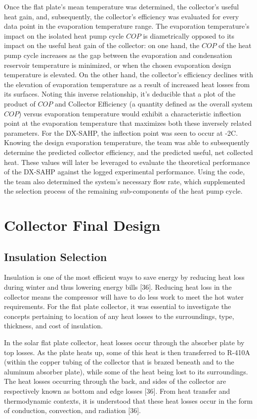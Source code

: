 \medskip
Once the flat plate’s mean temperature was determined, the collector’s useful heat gain, and, subsequently, the collector’s efficiency was evaluated for every data point in the evaporation temperature range. The evaporation temperature’s impact on the isolated heat pump cycle $COP$ is diametrically opposed to its impact on the useful heat gain of the collector: on one hand, the $COP$ of the heat pump cycle increases as the gap between the evaporation and condensation reservoir temperature is minimized, or when the chosen evaporation design temperature is elevated. On the other hand, the collector’s efficiency declines with the elevation of evaporation temperature as a result of increased heat losses from its surfaces. Noting this inverse relationship, it’s deducible that a plot of the product of $COP$ and Collector Efficiency (a quantity defined as the overall system $COP$) versus evaporation temperature would exhibit a characteristic inflection point at the evaporation temperature that maximizes both these inversely related parameters. For the DX-SAHP, the inflection point was seen to occur at -2\textdegree C. Knowing the design evaporation temperature, the team was able to subsequently determine the predicted collector efficiency, and the predicted useful, net collected heat. These values will later be leveraged to evaluate the theoretical performance of the DX-SAHP against the logged experimental performance. Using the code, the team also determined the system’s necessary flow rate, which supplemented the selection process of the remaining sub-components of the heat pump cycle.

\section{Collector Final Design}

\subsection{Insulation Selection}

Insulation is one of the most efficient ways to save energy by reducing heat loss during winter and thus lowering energy bills [36]. Reducing heat loss in the collector means the compressor will have to do less work to meet the hot water requirements. For the flat plate collector, it was essential to investigate the concepts pertaining to location of any heat losses to the surroundings, type, thickness, and cost of insulation.

\medskip
In the solar flat plate collector, heat losses occur through the absorber plate by top losses. As the plate heats up, some of this heat is then transferred to R-410A (within the copper tubing of the collector that is brazed beneath and to the aluminum absorber plate), while some of the heat being lost to its surroundings. The heat losses occurring through the back, and sides of the collector are respectively known as bottom and edge losses [36]. From heat transfer and thermodynamic contexts, it is understood that these heat losses occur in the form of conduction, convection, and radiation [36].

